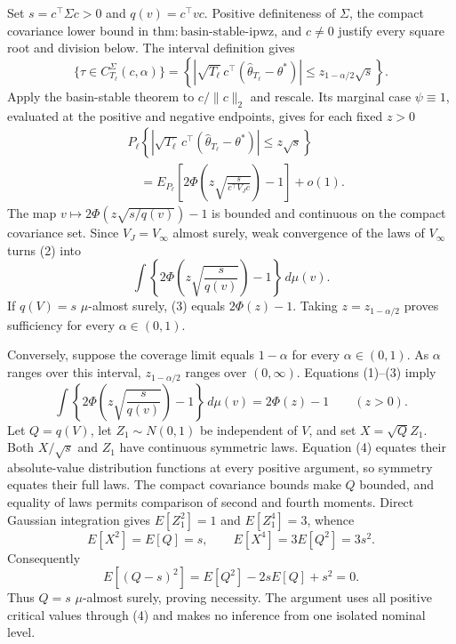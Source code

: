 Set \(s=c^\top\Sigma c>0\) and \(q(v)=c^\top vc\).  Positive definiteness of \(\Sigma\), the compact covariance lower bound in \(\mathrm{thm:basin\text{-}stable\text{-}ipwz}\), and \(c\ne0\) justify every square root and division below.  The interval definition gives
\[
 \{\tau\in C_{T_\ell}^{\Sigma}(c,\alpha)\}
 =\left\{\left|\sqrt{T_\ell}\,c^\top
 (\widehat\theta_{T_\ell}-\theta^*)\right|
 \le z_{1-\alpha/2}\sqrt s\right\}.
\tag{1}
\]
Apply the basin-stable theorem to \(c/\|c\|_2\) and rescale.  Its marginal case \(\psi\equiv1\), evaluated at the positive and negative endpoints, gives for each fixed \(z>0\)
\[
\begin{aligned}
 &P_\ell\!\left\{\left|\sqrt{T_\ell}\,c^\top
 (\widehat\theta_{T_\ell}-\theta^*)\right|\le z\sqrt s\right\}\\
 &\quad=E_{P_\ell}\!\left[
 2\Phi\!\left(z\sqrt{\frac{s}{c^\top V_Jc}}\right)-1\right]+o(1).
\end{aligned}
\tag{2}
\]
The map \(v\mapsto2\Phi(z\sqrt{s/q(v)})-1\) is bounded and continuous on the compact covariance set.  Since \(V_J=V_\infty\) almost surely, weak convergence of the laws of \(V_\infty\) turns (2) into
\[
 \int\left\{2\Phi\!\left(z\sqrt{\frac{s}{q(v)}}\right)-1\right\}
 \,d\mu(v).
\tag{3}
\]
If \(q(V)=s\) \(\mu\)-almost surely, (3) equals \(2\Phi(z)-1\).  Taking \(z=z_{1-\alpha/2}\) proves sufficiency for every \(\alpha\in(0,1)\).

Conversely, suppose the coverage limit equals \(1-\alpha\) for every \(\alpha\in(0,1)\).  As \(\alpha\) ranges over this interval, \(z_{1-\alpha/2}\) ranges over \((0,\infty)\).  Equations (1)--(3) imply
\[
 \int\left\{2\Phi\!\left(z\sqrt{\frac{s}{q(v)}}\right)-1\right\}
 \,d\mu(v)=2\Phi(z)-1\qquad(z>0).
\tag{4}
\]
Let \(Q=q(V)\), let \(Z_1\sim N(0,1)\) be independent of \(V\), and set \(X=\sqrt QZ_1\).  Both \(X/\sqrt s\) and \(Z_1\) have continuous symmetric laws.  Equation (4) equates their absolute-value distribution functions at every positive argument, so symmetry equates their full laws.  The compact covariance bounds make \(Q\) bounded, and equality of laws permits comparison of second and fourth moments.  Direct Gaussian integration gives \(E[Z_1^2]=1\) and \(E[Z_1^4]=3\), whence
\[
 E[X^2]=E[Q]=s,
 \qquad E[X^4]=3E[Q^2]=3s^2.
\tag{5}
\]
Consequently
\[
 E[(Q-s)^2]=E[Q^2]-2sE[Q]+s^2=0.
\tag{6}
\]
Thus \(Q=s\) \(\mu\)-almost surely, proving necessity.  The argument uses all positive critical values through (4) and makes no inference from one isolated nominal level.